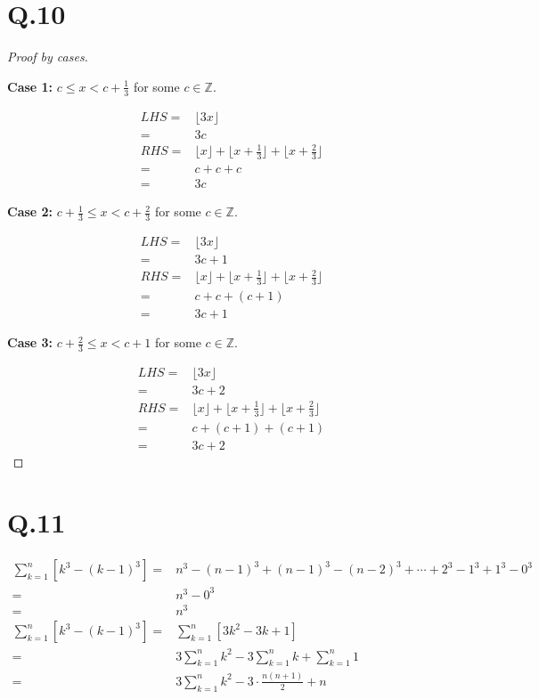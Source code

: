 \documentclass[a4paper,12pt]{article}
\begin{document}
\section*{Q.10}
\begin{proof}[Proof by cases]
$ $

\textbf{Case 1:} $c \leq x < c + \frac{1}{3}$ for some $c \in \mathbb{Z}$.

\begin{align*}
	LHS =& \lfloor 3x \rfloor\\
	=& 3c\\
	RHS =& \lfloor x \rfloor + \lfloor x + \frac{1}{3} \rfloor + \lfloor x + \frac{2}{3} \rfloor\\
	=& c + c + c\\
	=& 3c
\end{align*}

\textbf{Case 2:} $c + \frac{1}{3} \leq x < c + \frac{2}{3}$ for some $c \in \mathbb{Z}$.

\begin{align*}
	LHS =& \lfloor 3x \rfloor\\
	=& 3c + 1\\
	RHS =& \lfloor x \rfloor + \lfloor x + \frac{1}{3} \rfloor + \lfloor x + \frac{2}{3} \rfloor\\
	=& c + c + (c + 1)\\
	=& 3c + 1
\end{align*}

\textbf{Case 3:} $c + \frac{2}{3} \leq x < c + 1$ for some $c \in \mathbb{Z}$.

\begin{align*}
	LHS =& \lfloor 3x \rfloor\\
	=& 3c + 2\\
	RHS =& \lfloor x \rfloor + \lfloor x + \frac{1}{3} \rfloor + \lfloor x + \frac{2}{3} \rfloor\\
	=& c + (c + 1) + (c + 1)\\
	=& 3c + 2
\end{align*}
\end{proof}

\section*{Q.11}
\begin{align*}
	\sum_{k = 1}^{n} [k^3 - (k - 1)^3] =& n^3 - (n-1)^3 + (n-1)^3 - (n-2)^3 + \cdots + 2^3 - 1^3 + 1^3 - 0^3\\
	=& n^3 - 0^3\\
	=& n^3\\
	\sum_{k = 1}^{n} [k^3 - (k - 1)^3] =& \sum_{k = 1}^{n} [3k^2 - 3k + 1]\\
	=& 3\sum_{k = 1}^{n} k^2 - 3\sum_{k = 1}^{n} k + \sum_{k = 1}^{n} 1\\
	=& 3\sum_{k = 1}^{n} k^2 - 3\cdot \frac{n(n+1)}{2} + n
\end{align*}
\end{document}
